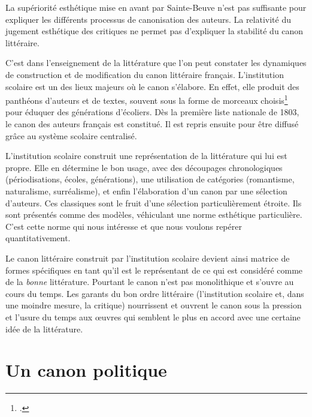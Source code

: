 La supériorité esthétique mise en avant par Sainte-Beuve n'est pas suffisante pour expliquer les différents processus de canonisation des auteurs. La relativité du jugement esthétique des critiques ne permet pas d'expliquer la stabilité du canon littéraire. 

C'est dans l'enseignement de la littérature que l'on peut constater les dynamiques de construction et de modification du canon littéraire français. L'institution scolaire est un des lieux majeurs où le canon s'élabore. En effet, elle produit des panthéons d'auteurs et de textes, souvent sous la forme de morceaux choisis\footcites{jey_litterature_1998} pour éduquer des générations d'écoliers. Dès la première liste nationale de 1803, le canon des auteurs français est constitué. Il est repris ensuite pour être diffusé grâce au système scolaire centralisé.

L’institution scolaire construit une représentation de la littérature qui lui est propre. Elle en détermine le bon usage, avec des découpages chronologiques (périodisations, écoles, générations), une utilisation de catégories (romantisme, naturalisme, surréalisme), et enfin l'élaboration d’un canon par une sélection d’auteurs. Ces classiques sont le fruit d’une sélection particulièrement étroite. Ils sont présentés comme des modèles, véhiculant une norme esthétique particulière. C'est cette norme qui nous intéresse et que nous voulons repérer quantitativement.

Le canon littéraire construit par l'institution scolaire devient ainsi matrice de formes spécifiques en tant qu'il est le représentant de ce qui est considéré comme de la \textit{bonne} littérature. Pourtant le canon n'est pas monolithique et s'ouvre au cours du temps. Les garants du bon ordre littéraire (l'institution scolaire et, dans une moindre mesure, la critique) nourrissent et ouvrent le canon sous la pression et l'usure du temps aux œuvres qui semblent le plus en accord avec une certaine idée de la littérature. 

\section{Un canon politique}

